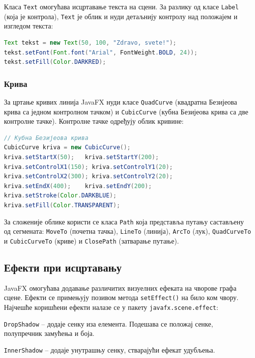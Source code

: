 Класа \texttt{Text} омогућава исцртавање текста на сцени. За разлику од класе \texttt{Label} (која је контрола), \texttt{Text} је облик и нуди детаљнију контролу над положајем и изгледом текста:


\begin{lstlisting}[language=Java]
Text tekst = new Text(50, 100, "Zdravo, svete!");
tekst.setFont(Font.font("Arial", FontWeight.BOLD, 24));
tekst.setFill(Color.DARKRED);
\end{lstlisting}


\subsubsection{Крива}

За цртање кривих линија JavaFX нуди класе \texttt{QuadCurve} (квадратна Безијеова крива са једном контролном тачком) и \texttt{CubicCurve} (кубна Безијеова крива са две контролне тачке). Контролне тачке одређују облик кривине:


\begin{lstlisting}[language=Java]
// Кубна Безијеова крива
CubicCurve kriva = new CubicCurve();
kriva.setStartX(50);   kriva.setStartY(200);
kriva.setControlX1(150); kriva.setControlY1(20);
kriva.setControlX2(300); kriva.setControlY2(20);
kriva.setEndX(400);    kriva.setEndY(200);
kriva.setStroke(Color.DARKBLUE);
kriva.setFill(Color.TRANSPARENT);
\end{lstlisting}


За сложеније облике користи се класа \texttt{Path} која представља путању састављену од сегмената: \texttt{MoveTo} (почетна тачка), \texttt{LineTo} (линија), \texttt{ArcTo} (лук), \texttt{QuadCurveTo} и \texttt{CubicCurveTo} (криве) и \texttt{ClosePath} (затварање путање).


\subsection{Ефекти при исцртавању}

JavaFX омогућава додавање различитих визуелних ефеката на чворове графа сцене. Ефекти се примењују позивом метода \texttt{setEffect()} на било ком чвору. Најчешће коришћени ефекти налазе се у пакету \texttt{javafx.scene.effect}:

\texttt{DropShadow} – додаје сенку иза елемента. Подешава се положај сенке, полупречник замућења и боја.

\texttt{InnerShadow} – додаје унутрашњу сенку, стварајући ефекат удубљења.

